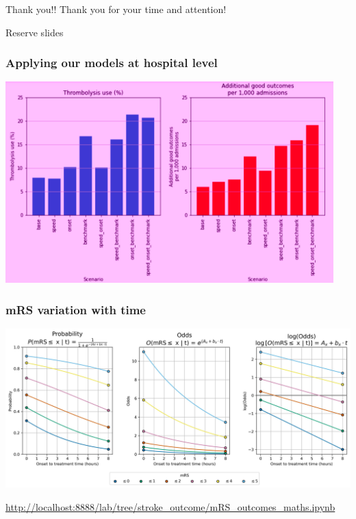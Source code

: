 \documentclass[xcolor={usenames,dvipsnames}]{beamer}
\newcommand{\smallurl}[1]{\textcolor{blue}{\fontsize{4pt}{4.8pt}\selectfont \url{#1}}}
\begin{document}
\begin{frame}{Thank you!!}
    Thank you for your time and attention!
\end{frame}




\begin{frame}[noframenumbering]{Reserve slides}
    
\end{frame}



\begin{frame}[noframenumbering]
\frametitle{Applying our models at hospital level}

\begin{center}
\includegraphics[width=0.95\textwidth]{./images_pink/hosp_scenario_1}
\end{center}

\end{frame}



\begin{frame}[noframenumbering]
\frametitle{mRS variation with time}

\begin{center} 
\includegraphics[width=\textwidth]{./images/time_varying_probs_odds_logodds}
\end{center} 

\vspace{1em}
\smallurl{http://localhost:8888/lab/tree/stroke_outcome/mRS_outcomes_maths.ipynb}

\end{frame}
\end{document}
